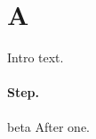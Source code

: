 \documentclass{article}
\newenvironment{pf}{\trivlist\item[\textbf{Proof.}]}{\endtrivlist}
\begin{document}
\section{A}
\begin{pf}
Intro text.
\paragraph{Step.} beta
\end{pf}
After one.
\end{document}
